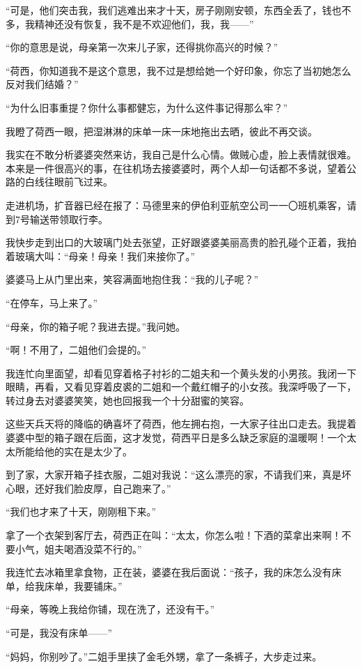 \par “可是，他们突击我，我们逃难出来才十天，房子刚刚安顿，东西全丢了，钱也不多，我精神还没有恢复，我不是不欢迎他们，我，我——”
\par “你的意思是说，母亲第一次来儿子家，还得挑你高兴的时候？”
\par “荷西，你知道我不是这个意思，我不过是想给她一个好印象，你忘了当初她怎么反对我们结婚？”
\par “为什么旧事重提？你什么事都健忘，为什么这件事记得那么牢？”
\par 我瞪了荷西一眼，把湿淋淋的床单一床一床地拖出去晒，彼此不再交谈。
\par 我实在不敢分析婆婆突然来访，我自己是什么心情。做贼心虚，脸上表情就很难。本来是一件很高兴的事，在往机场去接婆婆时，两个人却一句话都不多说，望着公路的白线往眼前飞过来。
\par 走进机场，扩音器已经在报了：马德里来的伊伯利亚航空公司一一〇班机乘客，请到7号输送带领取行李。
\par 我快步走到出口的大玻璃门处去张望，正好跟婆婆美丽高贵的脸孔碰个正着，我拍着玻璃大叫：“母亲！母亲！我们来接你了。”
\par 婆婆马上从门里出来，笑容满面地抱住我：“我的儿子呢？”
\par “在停车，马上来了。”
\par “母亲，你的箱子呢？我进去提。”我问她。
\par “啊！不用了，二姐他们会提的。”
\par 我连忙向里面望，却看见穿着格子衬衫的二姐夫和一个黄头发的小男孩。我闭一下眼睛，再看，又看见穿着皮裘的二姐和一个戴红帽子的小女孩。我深呼吸了一下，转过身去对婆婆笑笑，她也回报我一个十分甜蜜的笑容。
\par 这些天兵天将的降临的确喜坏了荷西，他左拥右抱，一大家子往出口走去。我提着婆婆中型的箱子跟在后面，这才发觉，荷西平日是多么缺乏家庭的温暖啊！一个太太所能给他的实在是太少了。
\par 到了家，大家开箱子挂衣服，二姐对我说：“这么漂亮的家，不请我们来，真是坏心眼，还好我们脸皮厚，自己跑来了。”
\par “我们也才来了十天，刚刚租下来。”
\par 拿了一个衣架到客厅去，荷西正在叫：“太太，你怎么啦！下酒的菜拿出来啊！不要小气，姐夫喝酒没菜不行的。”
\par 我连忙去冰箱里拿食物，正在装，婆婆在我后面说：“孩子，我的床怎么没有床单，给我床单，我要铺床。”
\par “母亲，等晚上我给你铺，现在洗了，还没有干。”
\par “可是，我没有床单——”
\par “妈妈，你别吵了。”二姐手里挟了金毛外甥，拿了一条裤子，大步走过来。
